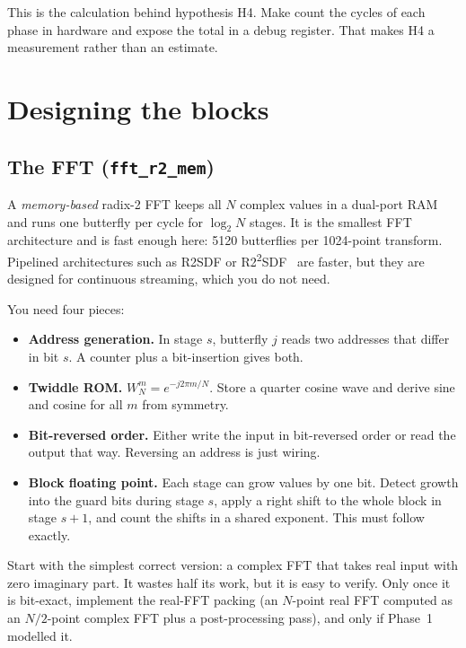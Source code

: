 This is the calculation behind hypothesis H4. Make  count the
cycles of each phase in hardware and expose the total in a debug register. That
makes H4 a measurement rather than an estimate.

\section{Designing the blocks}\label{sec:rtl:blocks}

\subsection{The FFT (\texttt{fft\_r2\_mem})}

A \emph{memory-based} radix-2 FFT keeps all $N$ complex values in a dual-port
RAM and runs one butterfly per cycle for $\log_2 N$ stages. It is the smallest
FFT architecture and is fast enough here: \num{5120} butterflies per 1024-point
transform. Pipelined architectures such as R2SDF or
R2\textsuperscript{2}SDF~\cite{he1996r22sdf,ch12-13:garrido2022fft} are faster,
but they are designed for continuous streaming, which you do not need.

You need four pieces:
\begin{itemize}
  \item \textbf{Address generation.} In stage $s$, butterfly $j$ reads two
  addresses that differ in bit $s$. A counter plus a bit-insertion gives both.
  \item \textbf{Twiddle ROM.} $W_N^m=e^{-j2\pi m/N}$. Store a quarter cosine
  wave and derive sine and cosine for all $m$ from symmetry.
  \item \textbf{Bit-reversed order.} Either write the input in bit-reversed
  order or read the output that way. Reversing an address is just wiring.
  \item \textbf{Block floating point.} Each stage can grow values by one bit.
  Detect growth into the guard bits during stage $s$, apply a right shift to the
  whole block in stage $s+1$, and count the shifts in a shared exponent. This
  must follow  exactly.
\end{itemize}

Start with the simplest correct version: a complex FFT that takes real input
with zero imaginary part. It wastes half its work, but it is easy to verify.
Only once it is bit-exact, implement the real-FFT packing (an $N$-point real FFT
computed as an $N/2$-point complex FFT plus a post-processing pass), and only if
Phase~1 modelled it.

